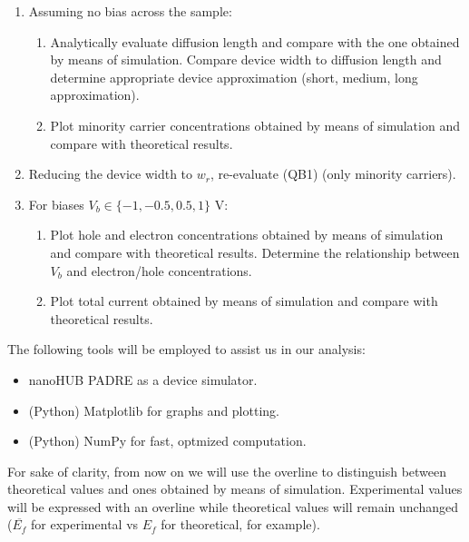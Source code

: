 \documentclass{book}
\begin{document}
            \begin{enumerate}[label=(QB\arabic*), leftmargin=1.5cm]
                \item Assuming no bias across the sample:
                \begin{enumerate}[label=(QB1.\arabic*)]
                    \item Analytically evaluate diffusion length and compare with the one obtained by means of simulation. Compare device width to diffusion length and determine appropriate device approximation (short, medium, long approximation).
                    \item Plot minority carrier concentrations obtained by means of simulation and compare with theoretical results.
                \end{enumerate}
                \item Reducing the device width to $w_{r}$, re-evaluate (QB1) (only minority carriers).
                \item For biases $V_{b} \in \{-1, -0.5, 0.5, 1\}$ V:
                \begin{enumerate}[label=(QB3.\arabic*)]
                    \item Plot hole and electron concentrations obtained by means of simulation and compare with theoretical results. Determine the relationship between $V_{b}$ and electron/hole concentrations.
                    \item Plot total current obtained by means of simulation and compare with theoretical results. 
                \end{enumerate}
            \end{enumerate}

            \vspace{10pt}
            The following tools will be employed to assist us in our analysis: 
            \begin{itemize}
                \item nanoHUB PADRE as a device simulator.
                \item (Python) Matplotlib for graphs and plotting.
                \item (Python) NumPy for fast, optmized computation.
            \end{itemize}

            \vspace{10pt}
            For sake of clarity, from now on we will use the overline to distinguish between theoretical values and ones obtained by means of simulation.
            Experimental values will be expressed with an overline while theoretical values will remain unchanged ($\overline{E_{f}}$ for experimental vs $E_{f}$ for theoretical, for example).
\end{document}
